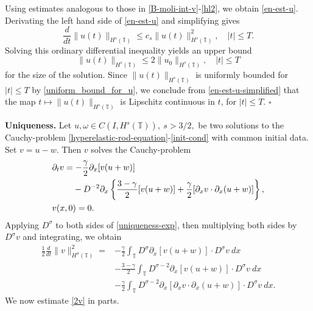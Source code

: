 \documentclass[12pt,reqno]{amsart}
\renewcommand{\qedsymbol}{\ensuremath{\square}}
\newcommand{\p}{\partial}
\newcommand{\ci}{\mathbb{T}}
\theoremstyle{plain}  %
\theoremstyle{definition}
\begin{document}
%
%
Using estimates analogous to those in \eqref{B-moli-int-v}-\eqref{hl2}, we 
obtain \eqref{en-est-u}.
Derivating the left hand side of \eqref{en-est-u} and simplifying gives
%
%
\begin{equation}
\label{en-est-u-simplified}
\frac{d}{dt} \|u(t)\|_{H^s(\ci)} \le c_s \|u(t)\|_{H^s(\ci)}^2, \quad |t| 
\le T.
\end{equation}
%
Solving this ordinary differential inequality yields an upper bound
%
%
\begin{equation}
\label{uniform_bound_for_u}
\|u(t)\|_{H^s(\ci)}
\le
2 \|u_0\|_{H^s(\ci)},
\quad |t| \le T
\end{equation}
%
%
%
for the size of the solution.  Since $\|u(t)\|_{H^s(\ci)}$
is uniformly bounded for $|t| \le T$ by
\eqref{uniform_bound_for_u}, we conclude from
\eqref{en-est-u-simplified} that the map $t \mapsto
\|u(t)\|_{H^s(\ci)}$ is Lipschitz continuous in $t$, for $|t| \le T$. \qquad \qedsymbol
%
%
%

{\bf Uniqueness.}
%
%
Let $u,\omega \in C(I, H^s(\ci)), \ s>3/2,$ be two solutions to the
Cauchy-problem \eqref{hyperelastic-rod-equation}-\eqref{init-cond} with
common initial data. Set $v=u-w$. Then $v$ solves the Cauchy-problem
%
%
\begin{align}
	\label{uniqueness-exp}
& \p_t v
=  -\frac{\gamma}{2} \p_x [v(u + w)] 
\\
\notag
& \phantom{\p_t v = }- D^{-2} \p_x \left\{
\frac{3-\gamma}{2}[v(u+w)] + \frac{\gamma}{2}[\p_x v \cdot \p_x (u+w)]
\right\},
\\
& v(x,0) = 0.
\label{uniqueness-init-data}
\end{align}
%
%
%
%
Applying $D^\sigma$ to both sides of \eqref{uniqueness-exp}, then 
multiplying both sides by $D^\sigma v$ and integrating, we obtain
%
%
\begin{equation}
\begin{split}
 \frac{1}{2} \frac{d}{dt} \|v\|_{H^\sigma(\ci)}^2
 = & -\frac{\gamma}{2} \int_{\ci} D^\sigma \p_x [v(u+w)] \cdot
D^\sigma v \ dx
\\
& - \frac{3-\gamma}{2} \int_{\ci}  D^{\sigma -2}
\p_x[v(u+w)] \cdot
D^\sigma v \ dx  
\\
& - \frac{\gamma}{2} \int_{\ci} D^{\sigma 
-2} \p_x [ \p_x v
\cdot \p_x (u+w)]\cdot D^\sigma v \ dx .
\label{2v}
\end{split}
\end{equation}
%
%
We now estimate \eqref{2v} in parts.
\end{document}
